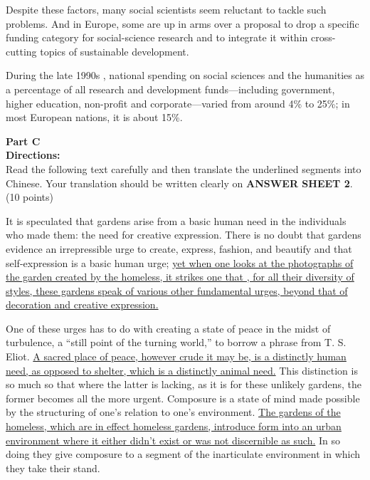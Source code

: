 \begin{listmatch}
\item 
Despite these factors, many social scientists seem reluctant to
tackle such problems. And in Europe, some are up in arms over a proposal
to drop a specific funding category for social-science research and to
integrate it within cross-cutting topics of sustainable development.




\item 
During the late 1990s , national spending on social sciences and
the humanities as a percentage of all research and development
funds---including government, higher education, non-profit and
corporate---varied from around 4\% to 25\%; in most European nations, it
is about 15\%.








\end{listmatch}



\newpage
\noindent
\textbf{Part C}\\
\textbf{Directions:}\\
Read the following text carefully and then translate the
	underlined segments into Chinese. Your translation should be written
	clearly on \textbf{ANSWER SHEET 2}. (10 points)



\TiGanSpace



It is speculated that gardens arise from a basic human need in the
individuals who made them: the need for creative expression. There is no
doubt that gardens evidence an irrepressible urge to create, express,
fashion, and beautify and that self-expression is a basic human urge;
\transnum \uline{yet when one looks at the photographs of the garden
	created by the homeless, it strikes one that , for all their diversity of
	styles, these gardens speak of various other fundamental urges, beyond
	that of decoration and creative expression.}

One of these urges has to do with creating a state of peace in the midst
of turbulence, a ``still point of the turning world,'' to borrow a
phrase from T. S. Eliot. \transnum \uline{A sacred place of peace,
	however crude it may be, is a distinctly human need, as opposed to
	shelter, which is a distinctly animal need.} This distinction is so much
so that where the latter is lacking, as it is for these unlikely
gardens, the former becomes all the more urgent. Composure is a state of
mind made possible by the structuring of one's relation to one's
environment. \transnum \uline{The gardens of the homeless, which are in
	effect homeless gardens, introduce form into an
	urban environment where it either didn't exist or was not discernible as
	such.} In so doing they give composure to a segment of the inarticulate
environment in which they take their stand.

